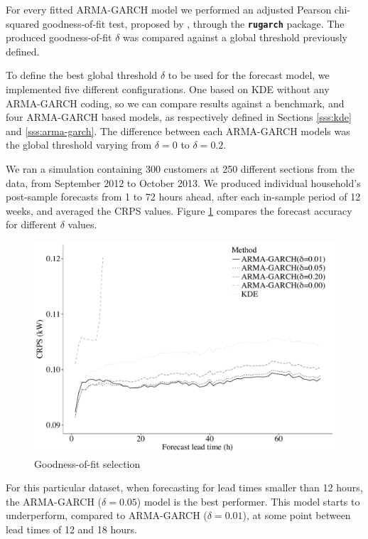 \documentclass[review, 3p, 12pt, authoryear]{elsarticle}
\begin{document}
For every fitted ARMA-GARCH model we performed an adjusted Pearson chi-squared goodness-of-fit test, proposed by \citet{vlaarpalm_gof}, through the \texttt{\textbf{rugarch}} package.
The produced goodness-of-fit $\delta$ was compared against a global threshold previously defined.

To define the best global threshold $\delta$ to be used for the forecast model, we implemented five different configurations.
One based on KDE without any ARMA-GARCH coding, so we can compare results against a benchmark, and four ARMA-GARCH based models, as respectively defined in Sections \ref{sss:kde} and \ref{sss:arma-garch}.
The difference between each ARMA-GARCH models was the global threshold varying from $\delta = 0$ to $\delta = 0.2$.

We ran a simulation containing 300 customers at 250 different sections from the data, from September 2012 to October 2013.
We produced individual household's post-sample forecasts from 1 to 72 hours ahead, after each in-sample period of 12 weeks, and averaged the CRPS values.
Figure \ref{fig:benchmark} compares the forecast accuracy for different $\delta$ values.

\begin{figure}
  \centering
  \includegraphics[width=0.8\columnwidth]{2017-10-13_big-gofmin_266_graylinesman.pdf}
  \caption{Goodness-of-fit selection}
  \label{fig:benchmark}
\end{figure}

For this particular dataset, when forecasting for lead times smaller than 12 hours, the ARMA-GARCH ($\delta = 0.05$) model is the best performer.
This model starts to underperform, compared to ARMA-GARCH ($\delta = 0.01$), at some point between lead times of 12 and 18 hours.


\end{document}

